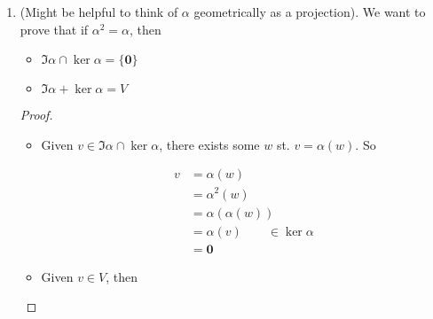 \documentclass[a4paper]{article}
\begin{document}
\begin{enumerate}
\begin{proof}
 			Hence $ v \in  $ RHS
 			
 		\end{proof}
 	
 	\begin{prop} 
 	\[ 	\ker( \alpha + \beta) \supset \ker \alpha \cap \ker \beta \]
 	\end{prop}
 	
 	\begin{proof}
 		Suppose $ u \in $ RHS 
 	\end{proof}
 	
 	\begin{proof}
 		Let $ u \in $ RHS, ie
 		
 		\begin{align*}
 		u & \in \{ u \in U \; | \; \alpha(u) = \mathbf{0} \} \cap \{ u \in U \; | \; \beta(u) = \mathbf{0} \}  \\
 		& = \{ u \in U \; | \; \alpha(u) = \beta(u) = \mathbf{0} \}\\
 		& \subset \{ u \in U \; | \; \alpha(u) + \beta(u) = \mathbf{0} \}\\
 		& = \ker (\alpha + \beta)
 		\end{align*}
 	\end{proof}
 
 
 \item (Might be helpful to think of $ \alpha $ geometrically as a projection).
 We want to prove that if $ \alpha^{2} = \alpha $, then
 
 \begin{itemize}
 	\item $ \Im \alpha  \cap \ker \alpha = \{ \mathbf{0} \}$
 	\item $ \Im \alpha + \ker \alpha = V $
 \end{itemize}

\begin{proof}
	\begin{itemize}
		\item Given $ v \in \Im \alpha  \cap \ker \alpha $, there exists some $ w $ st. $ v = \alpha(w) $. So
		
		\begin{align*}
		v & = \alpha(w) \\
		& = \alpha^{2}(w) \\
		& = \alpha(\alpha(w)) \\
		& = \alpha(v) \qquad \in \ker \alpha\\
		& = \mathbf{0}
		\end{align*}
		
		\item Given $ v \in V $, then
		

\end{itemize}
\end{proof}
\end{enumerate}
\end{document}
